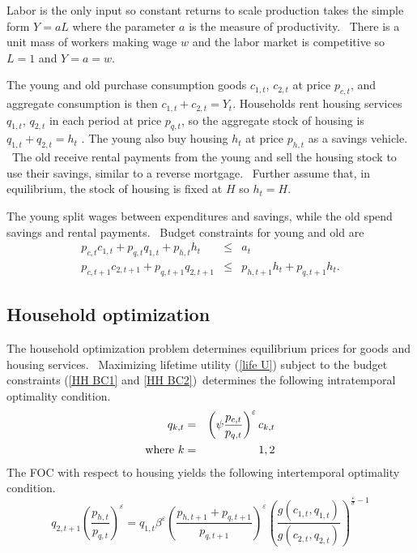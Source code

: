 \documentclass{article}
\begin{document}
\begin{doublespace}
Labor is the only input so constant returns to scale production takes the
simple form $Y=aL$ where the parameter $a$ is the measure of productivity. \
There is a unit mass of workers making wage $w$ and the labor market is
competitive so $L=1$ and $Y=a=w$. \ 

The young and old purchase consumption goods $c_{1,t}$, $c_{2,t}$ at price $%
p_{c,t}$, and aggregate consumption is then $c_{1,t}+c_{2,t}=Y_{t}.$
Households rent housing services $q_{1,t}$, $q_{2,t}$ in each period at
price $p_{q,t}$, so the aggregate stock of housing is $q_{1,t}+q_{2,t}=h_{t}$%
. The young also buy housing $h_{t}$ at price $p_{h,t}$ as a savings
vehicle. \ The old receive rental payments from the young and sell the
housing stock to use their savings, similar to a reverse mortgage. \ Further
assume that, in equilibrium, the stock of housing is fixed at $H$ so $%
h_{t}=H.$ \ 

The young split wages between expenditures and savings, while the old spend
savings and rental payments. \ Budget constraints for young and old are%
\begin{eqnarray}
p_{c,t}c_{1,t}+p_{q,t}q_{1,t}+p_{h,t}h_{t} &\leq &a_{t}  \label{HH BC1} \\
p_{c,t+1}c_{2,t+1}+p_{q,t+1}q_{2,t+1} &\leq &p_{h,t+1}h_{t}+p_{q,t+1}h_{t}.
\label{HH BC2}
\end{eqnarray}

\subsection{Household optimization}

The household optimization problem determines equilibrium prices for goods
and housing services. \ Maximizing lifetime utility (\ref{life U}) subject
to the budget constraints (\ref{HH BC1} and \ref{HH BC2})\ determines the
following intratemporal optimality condition.%
\begin{eqnarray}
q_{k,t} &=&\left( \psi \frac{p_{c,t}}{p_{q,t}}\right) ^{\varepsilon }c_{k,t}
\label{optcq} \\
\text{where }k &=&1,2  \notag
\end{eqnarray}%
The FOC with respect to housing yields the following intertemporal
optimality condition.%
\begin{equation}
q_{2,t+1}\left( \frac{p_{h,t}}{p_{q,t}}\right) ^{\varepsilon }=q_{1,t}\beta
^{\varepsilon }\left( \frac{p_{h,t+1}+p_{q,t+1}}{p_{q,t+1}}\right)
^{\varepsilon }\left( \frac{g\left( c_{1,t},q_{1,t}\right) }{g\left(
c_{2,t},q_{2,t}\right) }\right) ^{\frac{\varepsilon }{\sigma }-1}
\label{opth}
\end{equation}


\end{doublespace}
\end{document}
